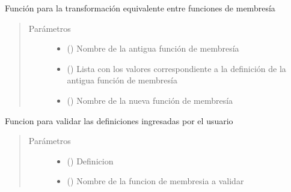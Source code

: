 \documentclass[letterpaper,10pt,spanish]{sphinxmanual}
\begin{document}
\begin{fulllineitems}
\label{\detokenize{codigos/modificadorMF:modificadorMf.update_definicionmf}}
Función para la transformación equivalente entre funciones de membresía
\begin{quote}\begin{description}
\item[{Parámetros}] \leavevmode\begin{itemize}
\item {} 
 () \textendash{} Nombre de la antigua función de membresía

\item {} 
 () \textendash{} Lista con los valores correspondiente a la definición de la antigua función de membresía

\item {} 
 () \textendash{} Nombre de la nueva función de membresía

\end{itemize}

\end{description}\end{quote}

\end{fulllineitems}


\begin{fulllineitems}
\label{\detokenize{codigos/modificadorMF:modificadorMf.validacion_mf}}
Funcion para validar las definiciones ingresadas por el usuario
\begin{quote}\begin{description}
\item[{Parámetros}] \leavevmode\begin{itemize}
\item {} 
\sphinxstyleliteralstrong{\sphinxupquote{\_}} () \textendash{} Definicion

\item {} 
 () \textendash{} Nombre de la funcion de membresia a validar

\end{itemize}

\end{description}\end{quote}

\end{fulllineitems}
\end{document}
